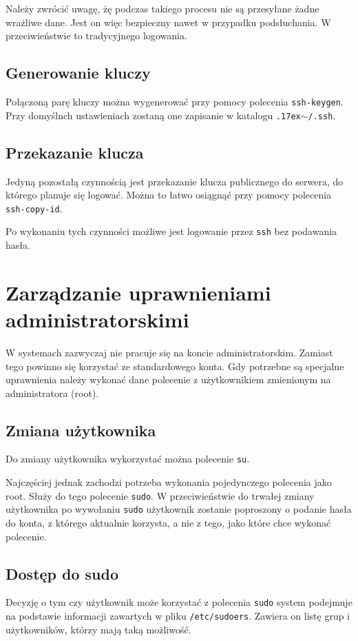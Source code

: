 \documentclass{article}
\begin{document}
Należy zwrócić uwagę, żę podczas takiego procesu nie są przesyłane żadne wrażliwe dane. Jest on więc bezpieczny nawet w przypadku podsłuchania. W przeciwieństwie to tradycyjnego logowania.

\subsection{Generowanie kluczy}
Połączoną parę kluczy można wygenerować przy pomocy polecenia \texttt{ssh-keygen}. Przy domyślnch ustawieniach zostaną one zapisanie w katalogu \texttt{{\raise.17ex\hbox{$\scriptstyle\sim$}}/.ssh}.

\subsection{Przekazanie klucza}
Jedyną pozostałą czynnością jest przekazanie klucza publicznego do serwera, do którego planuje się logować. Można to łatwo osiągnąć przy pomocy polecenia \texttt{ssh-copy-id}.

Po wykonaniu tych czynności możliwe jest logowanie przez \texttt{ssh} bez podawania hasła.

\section{Zarządzanie uprawnieniami administratorskimi}
W systemach zazwyczaj nie pracuje się na koncie administratorskim. Zamiast tego powinno się korzystać ze standardowego konta. Gdy potrzebne są specjalne uprawnienia należy wykonać dane polecenie z użytkownikiem zmienionym na administratora (root).

\subsection{Zmiana użytkownika}
Do zmiany użytkownika wykorzystać można polecenie \texttt{su}.

Najczęściej jednak zachodzi potrzeba wykonania pojedynczego polecenia jako root. Służy do tego polecenie \texttt{sudo}. W przeciwieństwie do trwałej zmiany użytkownika po wywołaniu \texttt{sudo} użytkownik zostanie poproszony o podanie hasła do konta, z którego aktualnie korzysta, a nie z tego, jako które chce wykonać polecenie.

\subsection{Dostęp do sudo}
Decyzję o tym czy użytkownik może korzystać z polecenia \texttt{sudo} system podejmuje na podstawie informacji zawartych w pliku \texttt{/etc/sudoers}. Zawiera on listę grup i użytkowników, którzy mają taką możliwość.
\end{document}
